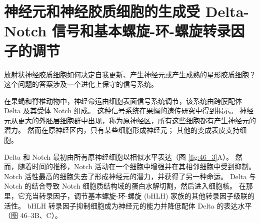 \section{神经元和神经胶质细胞的生成受 Delta-Notch 信号和基本螺旋-环-螺旋转录因子的调节}
放射状神经胶质细胞如何决定自我更新、产生神经元或产生成熟的星形胶质细胞？ 这个问题的答案涉及一个进化上保守的信号系统。

在果蝇和脊椎动物中，神经命运由细胞表面信号系统调节，该系统由跨膜配体 Delta 及其受体 Notch 组成。 这种信号系统在果蝇的遗传研究中得到揭示。 神经元从更大的外胚层细胞群中出现，称为原神经区，所有这些细胞都有产生神经元的潜力。 然而在原神经区内，只有某些细胞形成神经元； 其他的变成表皮支持细胞。

Delta 和 Notch 最初由所有原神经细胞以相似水平表达（图 \ref{fig:46_3}A）。 
然而，随着时间的推移，Notch 活动在一个细胞中增强并在其相邻细胞中受到抑制。 Notch 活性最高的细胞失去了形成神经元的潜力，并获得了另一种命运。 Delta 与 Notch 的结合导致 Notch 细胞质结构域的蛋白水解切割，然后进入细胞核。 在那里，它充当转录因子，调节基本螺旋-环-螺旋 (bHLH) 家族的其他转录因子级联的活性。 bHLH 转录因子抑制细胞成为神经元的能力并降低配体 Delta 的表达水平（图 46–3B、C）。

